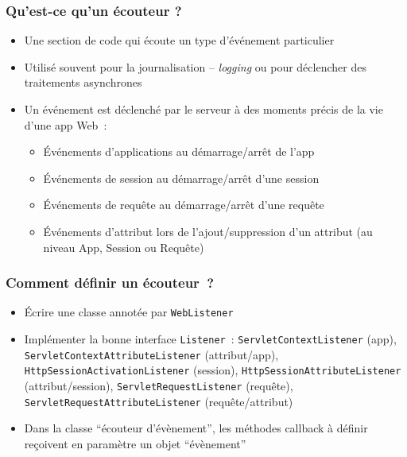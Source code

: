 \documentclass{beamer}
\begin{document}
\begin{frame}
	\frametitle{Qu'est-ce qu'un écouteur ?}
	\begin{itemize}
		\item Une section de code qui écoute un type d'événement particulier
		\item Utilisé souvent pour la journalisation -- \textit{logging} ou pour déclencher des traitements asynchrones
		\item Un événement est déclenché par le serveur à des moments précis de la vie d'une app Web~:
		\begin{itemize}
			\item Événements d'applications au démarrage/arrêt de l'app
			\item Événements de session au démarrage/arrêt d'une session
			\item Événements de requête au démarrage/arrêt d'une requête
			\item Événements d'attribut lors de l'ajout/suppression d'un attribut (au niveau App, Session ou Requête)
		\end{itemize}
	\end{itemize}
\end{frame}

\begin{frame}
	\frametitle{Comment définir un écouteur~?}
	\begin{itemize}
		\item Écrire une classe annotée par \texttt{WebListener} 
		\item Implémenter la bonne interface \texttt{Listener}~: \texttt{ServletContextListener} (app), \texttt{ServletContextAttributeListener} (attribut/app), \texttt{HttpSessionActivationListener} (session), \texttt{HttpSessionAttributeListener} (attribut/session), 
		\texttt{ServletRequestListener} (requête),
		\texttt{ServletRequestAttributeListener} (requête/attribut)
		\item Dans la classe ``écouteur d'évènement'', les méthodes callback à définir reçoivent en paramètre un objet ``évènement''
	\end{itemize}
\end{frame}
\end{document}
